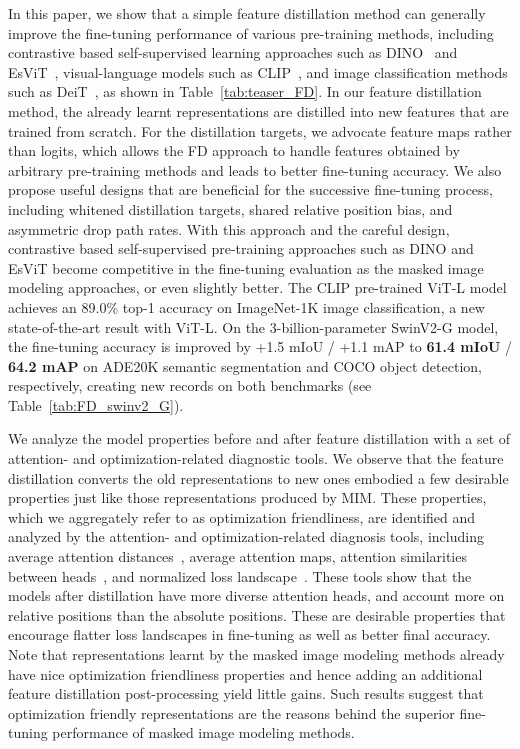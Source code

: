 \documentclass{article}
\begin{document}
In this paper, we show that a simple feature distillation method can generally improve the fine-tuning performance of various pre-training methods, including contrastive based self-supervised learning approaches such as DINO~\cite{caron2021emerging} and EsViT~\cite{li2021esvit}, visual-language models such as CLIP~\cite{radford2021clip}, and image classification methods such as DeiT~\cite{touvron2021training}, as shown in Table~\ref{tab:teaser_FD}. In our feature distillation method, the already learnt representations are distilled into new features that are trained from scratch. For the distillation targets, we advocate feature maps rather than logits, which allows the FD approach to handle features obtained by arbitrary pre-training methods and leads to better fine-tuning accuracy. We also propose useful designs that are beneficial for the successive fine-tuning process, including whitened distillation targets, shared relative position bias, and asymmetric drop path rates. With this approach and the careful design, contrastive based self-supervised pre-training approaches such as DINO and EsViT become competitive in the fine-tuning evaluation as the masked image modeling approaches, or even slightly better. The CLIP pre-trained ViT-L model achieves an 89.0\% top-1 accuracy on ImageNet-1K image classification, a new state-of-the-art result with ViT-L. On the 3-billion-parameter SwinV2-G model, the fine-tuning accuracy is improved by +1.5 mIoU / +1.1 mAP to \textbf{61.4 mIoU} / \textbf{64.2 mAP} on ADE20K semantic segmentation and COCO object detection, respectively, creating new records on both benchmarks (see Table~\ref{tab:FD_swinv2_G}).

We analyze the model properties before and after feature distillation with a set of attention- and optimization-related diagnostic tools. We observe that
the feature distillation converts the old representations to new ones embodied a few desirable properties just like those representations produced by MIM. These properties, which we aggregately refer to as optimization friendliness, are identified and analyzed by the attention- and optimization-related diagnosis tools, including average attention distances~\cite{dosovitskiy2020vit}, average attention maps, attention similarities between heads~\cite{zhou2021deepvit}, and normalized loss landscape~\cite{losslandscape2017}. These tools show that the models after distillation have more diverse attention heads, and account more on relative positions than the absolute positions. These are desirable properties that encourage flatter loss landscapes in fine-tuning as well as better final accuracy. Note that representations learnt by the masked image modeling methods already have nice optimization friendliness properties and hence adding an additional feature distillation post-processing yield little gains. Such results suggest that optimization friendly representations are the reasons behind the superior fine-tuning performance of masked image modeling methods. 
\end{document}
